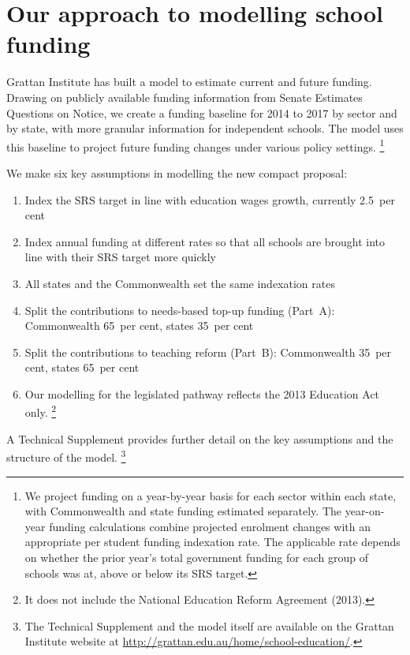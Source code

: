 \documentclass{grattan}
\begin{document}
\section{Our approach to modelling school funding}\label{sec:how-does-report-model-school-funding}

Grattan Institute has built a model to estimate current and future funding.
Drawing on publicly available funding information from Senate Estimates Questions on Notice, we create a funding baseline for 2014 to 2017 by sector and by state, with more granular information for independent schools.
The model uses this baseline to project future funding changes under various policy settings.%
\footnote{We project funding on a year-by-year basis for each sector within each state, with Commonwealth and state funding estimated separately.
The year-on-year funding calculations combine projected enrolment changes with an appropriate per student funding indexation rate.
The applicable rate depends on whether the prior year's total government funding for each group of schools was at, above or below its SRS target.}

We make six key assumptions in modelling the new compact proposal:
\begin{enumerate}%
\raggedright
\item Index the SRS target in line with education wages growth, currently 2.5~per cent
\item Index annual funding at different rates so that all schools are brought into line with their SRS target more quickly
\item All states and the Commonwealth set the same indexation rates
\item Split the contributions to needs-based top-up funding (Part~A): Commonwealth 65~per cent, states 35~per cent
\item Split the contributions to teaching reform (Part~B): Commonwealth 35~per cent, states 65~per cent
\item Our modelling for the legislated pathway reflects the 2013 Education Act only.%
\footnote{It does not include the National Education Reform Agreement (2013).}
\end{enumerate}

A Technical Supplement provides further detail on the key assumptions and the structure of the model.%
\footnote{The Technical Supplement and the model itself are available on the Grattan Institute website at \textcolor{blue}{\url{http://grattan.edu.au/home/school-education/}}.}
\end{document}

